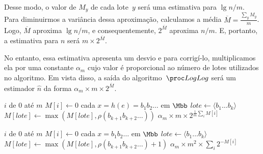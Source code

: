 Desse modo, o valor de $M_y$ de cada lote~$y$ será uma estimativa para $\lg n / m$. Para diminuirmos a variância dessa
aproximação, calculamos a média $\overline{M} = \frac{\sum_y M_y}{m}$. Logo, $\overline{M}$ aproxima $\lg n / m$, e 
consequentemente, $2^{\overline{M}}$ aproxima $n / m$. E, portanto, a estimativa para $n$ será 
$m \times 2^{\overline{M}}$.

No entanto, essa estimativa apresenta um desvio e para corrigí-lo, multiplicamos ela por uma constante $\alpha_m$ cujo 
valor é proporcional ao número de lotes utilizados no algoritmo. Em vista disso, a saída do algoritmo~$\LOG$ será um 
estimador $\hat{n}$ da forma $\alpha_m \times m \times 2^{\overline{M}}$. 

\begin{codebox}
  \li \For $i$ de $0$ até $m$
        \Do
  \li   $M[i] \gets 0$
        \End
  \li \For cada $x = h(e) = b_1b_2{\dots}$ em $\Mbb$ 
        \Do
  \li   $lote \gets \langle b_1 {\dots} b_k \rangle$
  \li   $M[lote] \gets \max(M[lote], \rho(b_{k+1}b_{k+2}{\dots}))$
        \End
  \li
  \Return $\alpha_m \times m \times 2^{\frac{1}{m}\sum_i{M[i]}}$   
  \End
\end{codebox}

\begin{codebox}
      \li \For $i$ de $0$ até $m$
            \Do
      \li   $M[i] \gets 0$
            \End
      \li \For cada $x = b_1b_2{\dots}$ em $\Mbb$ 
            \Do
      \li   $lote \gets \langle b_1 {\dots} b_k \rangle$
      \li   $M[lote] \gets \max(M[lote], \rho(b_{k+1}b_{k+2}{\dots}) + 1)$
            \End
      \li
      \Return $\alpha_m \times m^2 \times \sum_i{2^{-M[i]}}$   
      \End
    \end{codebox}